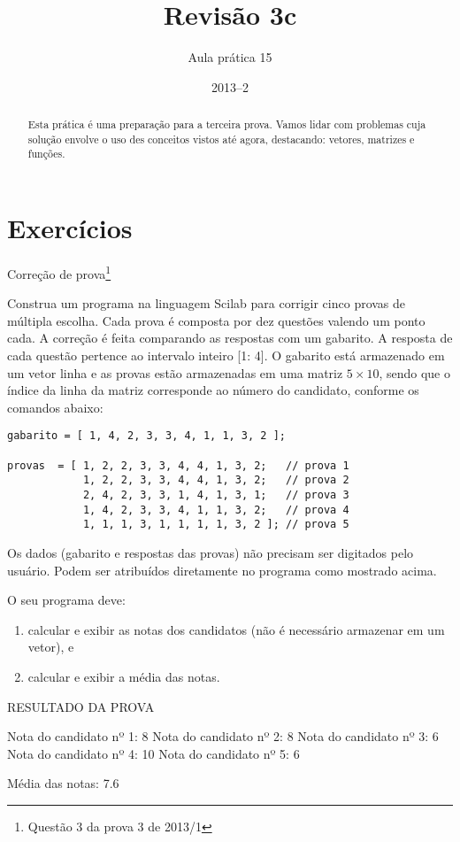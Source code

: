 \documentclass[11pt]{practice}
\begin{document}
\subtitle{Aula prática 15}
\title{Revisão 3c}
\author{}
\date{2013--2}
\maketitle

\begin{abstract}
  Esta prática é uma preparação para a terceira prova. Vamos lidar com
  problemas cuja solução envolve o uso des conceitos vistos até agora,
  destacando: vetores, matrizes e funções.
\end{abstract}


\section{Exercícios}

\begin{task}[breakable]{Correção de prova\footnote{Questão 3 da prova 3 de 2013/1}}{}

  Construa um programa na linguagem Scilab para corrigir cinco provas de
  múltipla escolha. Cada prova é composta por dez questões valendo um
  ponto cada. A correção é feita comparando as respostas com um
  gabarito. A resposta de cada questão pertence ao intervalo inteiro [1:
  4]. O gabarito está armazenado em um vetor linha e as provas estão
  armazenadas em uma matriz $5 \times 10$, sendo que o índice da linha
  da matriz corresponde ao número do candidato, conforme os comandos
  abaixo:

  \begin{verbatim}
gabarito = [ 1, 4, 2, 3, 3, 4, 1, 1, 3, 2 ];

provas  = [ 1, 2, 2, 3, 3, 4, 4, 1, 3, 2;   // prova 1
            1, 2, 2, 3, 3, 4, 4, 1, 3, 2;   // prova 2
            2, 4, 2, 3, 3, 1, 4, 1, 3, 1;   // prova 3
            1, 4, 2, 3, 3, 4, 1, 1, 3, 2;   // prova 4
            1, 1, 1, 3, 1, 1, 1, 1, 3, 2 ]; // prova 5
  \end{verbatim}

  Os dados (gabarito e respostas das provas) não precisam ser digitados
  pelo usuário. Podem ser atribuídos diretamente no programa como
  mostrado acima.

  O seu programa deve:
  \begin{enumerate}
    \item calcular e exibir as notas dos candidatos (não é necessário
    armazenar em um vetor), e
    \item calcular e exibir a média das notas.
  \end{enumerate}

  \begin{runexample}
RESULTADO DA PROVA

Nota do candidato nº 1: 8
Nota do candidato nº 2: 8
Nota do candidato nº 3: 6
Nota do candidato nº 4: 10
Nota do candidato nº 5: 6

Média das notas: 7.6
  \end{runexample}

  \tcblower
  \solution
\end{task}
\end{document}
